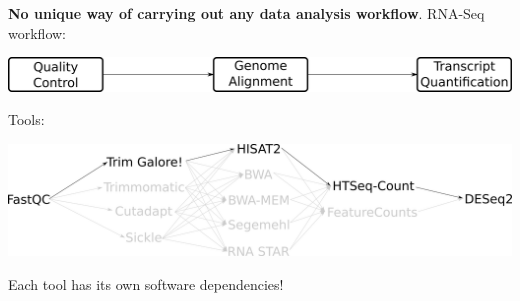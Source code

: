 \documentclass[x11names, svgnames]{beamer}
\begin{document}
\begin{frame}
  \frametitle{\four}
  \textbf{No unique way of carrying out any data analysis workflow}.\newline
  \newline
  RNA-Seq workflow:
  \begin{center}
    \includegraphics[scale=0.2]{images/workflow-rna-seq}
    \vspace{1em}
  \end{center}
  Tools:
  \begin{center}
    \includegraphics[scale=0.2]{images/workflow-rna-seq-tools-preferred}
    \vspace{1em}
  \end{center}
  Each tool has its own software dependencies!
\end{frame}
\end{document}
